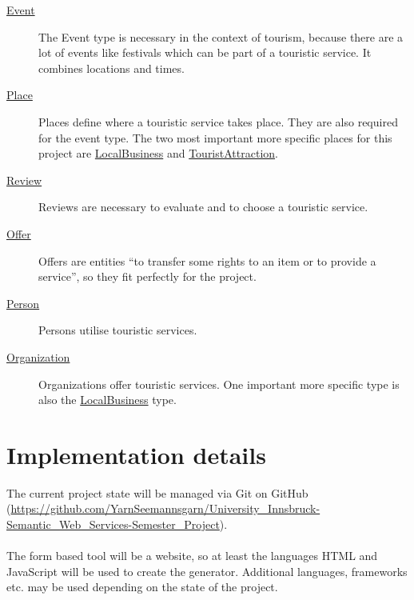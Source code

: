 \documentclass[paper=a4, fontsize=12pt]{scrartcl} %
\numberwithin{equation}{section} %
\numberwithin{figure}{section} %
\numberwithin{table}{section} %
\begin{document}
\begin{description}
\item[\href{https://schema.org/Event}{Event}] The Event type is necessary in the context of tourism, because there are a lot of events like festivals which can be part of a touristic service. It combines locations and times.
\item[\href{https://schema.org/Place}{Place}] Places define where a touristic service takes place. They are also required for the event type. The two most important more specific places for this project are \href{https://schema.org/LocalBusiness}{LocalBusiness} and \href{https://schema.org/TouristAttraction}{TouristAttraction}.
\item[\href{https://schema.org/Review}{Review}] Reviews are necessary to evaluate and to choose a touristic service.
\item[\href{https://schema.org/Offer}{Offer}] Offers are entities ``to transfer some rights to an item or to provide a service'', so they fit perfectly for the project.
\item[\href{https://schema.org/Person}{Person}] Persons utilise touristic services.
\item[\href{https://schema.org/Organization}{Organization}] Organizations offer touristic services. One important more specific type is also the \href{https://schema.org/LocalBusiness}{LocalBusiness} type.
\end{description}


\section{Implementation details}
\label{sec:implementation_details}

The current project state will be managed via Git on GitHub (\href{https://github.com/YarnSeemannsgarn/University_Innsbruck-Semantic_Web_Services-Semester_Project}{https://\allowbreak{}github.\allowbreak{}com/\allowbreak{}YarnSeemannsgarn/\allowbreak{}University\_Innsbruck-\allowbreak{}Semantic\_Web\_Services-\allowbreak{}Semester\_Project}).\\
\\
The form based tool will be a website, so at least the languages HTML and JavaScript will be used to create the generator. Additional languages, frameworks etc. may be used depending on the state of the project.


\end{document}

